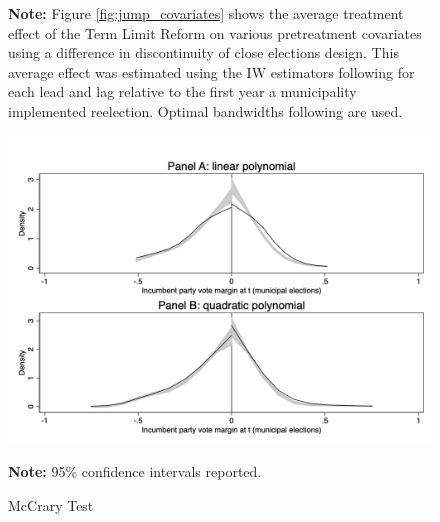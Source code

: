 \documentclass[12pt]{amsart}
\numberwithin{equation}{section}
\theoremstyle{definition}
\theoremstyle{definition}
\theoremstyle{definition}
\begin{document}
\begin{appendix}
\begin{figure}[h]
 \textbf{Note:} Figure \ref{fig:jump_covariates} shows the average treatment effect of the Term Limit Reform on various pretreatment covariates using a difference in discontinuity of close elections design. This average effect was estimated using the IW estimators following \citet{abraham_sun_2020} for each lead and lag relative to the first year a municipality implemented reelection. Optimal bandwidths following \citet{calonicoetal_2014} are used. 
   
\end{figure} 

  
    
    
\begin{figure}[h]   
\centering
 \caption{McCrary Test}
 \label{fig:mccrary}
\includegraphics[width=1\textwidth]{Figures_incumbency/mccrary_pol1_2.png}

       \captionsetup{justification=centering}
         
 \textbf{Note:} 95\% confidence intervals reported.
 
\end{figure} 



\end{appendix}
\end{document}
